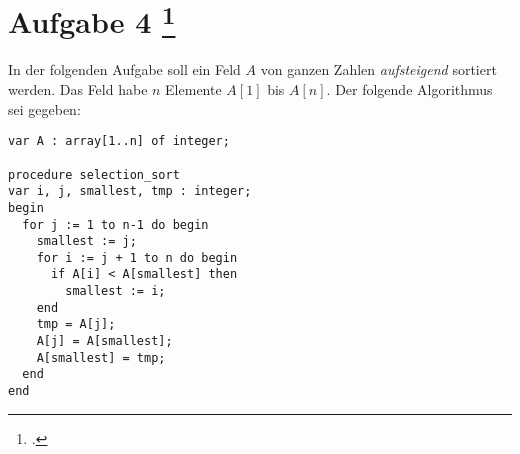 \documentclass{lehramt-informatik-aufgabe}
\begin{document}
\section{Aufgabe 4
\footcite{46115:2019:09}}

In der folgenden Aufgabe soll ein Feld $A$ von ganzen Zahlen
\emph{aufsteigend} sortiert werden. Das Feld habe $n$ Elemente $A[1]$
bis $A[n]$. Der folgende Algorithmus sei gegeben:

\begin{verbatim}
var A : array[1..n] of integer;

procedure selection_sort
var i, j, smallest, tmp : integer;
begin
  for j := 1 to n-1 do begin
    smallest := j;
    for i := j + 1 to n do begin
      if A[i] < A[smallest] then
        smallest := i;
    end
    tmp = A[j];
    A[j] = A[smallest];
    A[smallest] = tmp;
  end
end
\end{verbatim}
\end{document}
